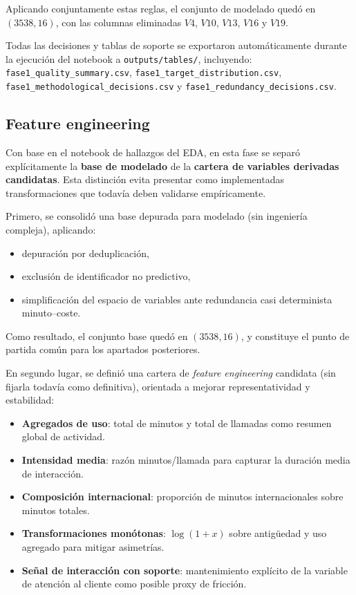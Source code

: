 Aplicando conjuntamente estas reglas, el conjunto de modelado quedó en \((3538, 16)\), con las columnas eliminadas \(V4\), \(V10\), \(V13\), \(V16\) y \(V19\).

Todas las decisiones y tablas de soporte se exportaron automáticamente durante la ejecución del notebook a \texttt{outputs/tables/}, incluyendo:
\texttt{fase1\_quality\_summary.csv},
\texttt{fase1\_target\_distribution.csv},
\texttt{fase1\_methodological\_decisions.csv} y
\texttt{fase1\_redundancy\_decisions.csv}.

\subsection{Feature engineering}

Con base en el notebook de hallazgos del EDA, en esta fase se separó explícitamente la \textbf{base de modelado} de la \textbf{cartera de variables derivadas candidatas}. Esta distinción evita presentar como implementadas transformaciones que todavía deben validarse empíricamente.

Primero, se consolidó una base depurada para modelado (sin ingeniería compleja), aplicando:

\begin{itemize}
	\item depuración por deduplicación,
	\item exclusión de identificador no predictivo,
	\item simplificación del espacio de variables ante redundancia casi determinista minuto--coste.
\end{itemize}

Como resultado, el conjunto base quedó en \((3538, 16)\), y constituye el punto de partida común para los apartados posteriores.

En segundo lugar, se definió una cartera de \textit{feature engineering} candidata (sin fijarla todavía como definitiva), orientada a mejorar representatividad y estabilidad:

\begin{itemize}
	\item \textbf{Agregados de uso}: total de minutos y total de llamadas como resumen global de actividad.
	\item \textbf{Intensidad media}: razón minutos/llamada para capturar la duración media de interacción.
	\item \textbf{Composición internacional}: proporción de minutos internacionales sobre minutos totales.
	\item \textbf{Transformaciones monótonas}: \(\log(1+x)\) sobre antigüedad y uso agregado para mitigar asimetrías.
	\item \textbf{Señal de interacción con soporte}: mantenimiento explícito de la variable de atención al cliente como posible proxy de fricción.
\end{itemize}

